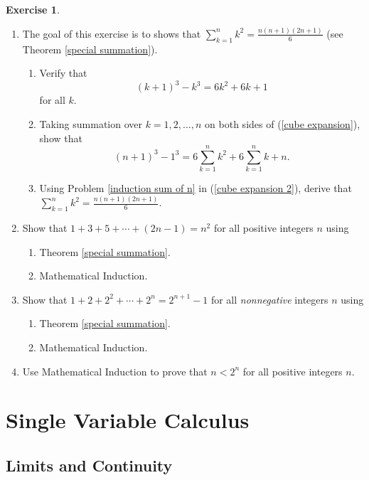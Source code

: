 \documentclass[12pt,letterpaper]{book}
\numberwithin{equation}{section}
\theoremstyle{definition}
\newtheorem{exercise}{\textbf{Exercise}}[chapter]
\begin{document}
\begin{exercise} \quad
\begin{enumerate}[\bfseries 1.]
\item The goal of this exercise is to shows that $\displaystyle{\sum_{k=1}^n k^2=\frac{n(n+1)(2n+1)}{6}}$ (see Theorem \ref{special summation}).
\begin{enumerate}
\item Verify that
\begin{equation}\label{cube expansion} (k+1)^3-k^3=6k^2+6k+1 \end{equation}
 for all $k$.
\item Taking summation over $k=1,2,\ldots,n$ on both sides of (\ref{cube expansion}), show that
\begin{equation}\label{cube expansion 2}
(n+1)^3-1^3=6\sum_{k=1}^n k^2+6\sum_{k=1}^n k+n.
\end{equation}
\item Using Problem \ref{induction sum of n} in (\ref{cube expansion 2}), derive that $\displaystyle{\sum_{k=1}^n k^2=\frac{n(n+1)(2n+1)}{6}}$.
\end{enumerate}
\item Show that $1+3+5+\cdots+(2n-1)=n^2$ for all positive integers $n$ using
\begin{enumerate}
\item Theorem \ref{special summation}.
\item Mathematical Induction.
\end{enumerate}
\item Show that $1+2+2^2+\cdots+2^n=2^{n+1}-1$ for all \textit{nonnegative} integers $n$ using
\begin{enumerate}
\item Theorem \ref{special summation}.
\item Mathematical Induction.
\end{enumerate}
\item Use Mathematical Induction to prove that $n<2^n$ for all positive integers $n$.
\end{enumerate}
\end{exercise}

\chapter{Single Variable Calculus}

\section{Limits and Continuity}
\end{document}
